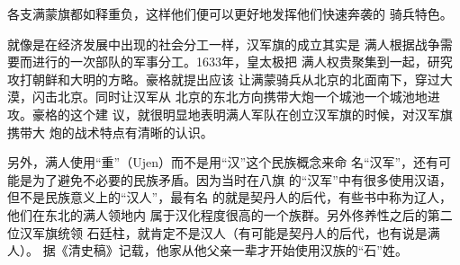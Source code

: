 各支满蒙旗都如释重负，这样他们便可以更好地发挥他们快速奔袭的%
骑兵特色。%
\par
就像是在经济发展中出现的社会分工一样，汉军旗的成立其实是%
满人根据战争需要而进行的一次部队的军事分工。1633年，皇太极把%
满人权贵聚集到一起，研究攻打朝鲜和大明的方略。豪格就提出应该%
让满蒙骑兵从北京的北面南下，穿过大漠，闪击北京。同时让汉军从%
北京的东北方向携带大炮一个城池一个城池地进攻。豪格的这个建%
议，就很明显地表明满人军队在创立汉军旗的时候，对汉军旗携带大%
炮的战术特点有清晰的认识。%
\par
另外，满人使用“重”（Ujen）而不是用“汉”这个民族概念来命%
名“汉军”，还有可能是为了避免不必要的民族矛盾。因为当时在八旗%
的“汉军”中有很多使用汉语，但不是民族意义上的“汉人”，最有名%
的就是契丹人的后代，有些书中称为辽人，他们在东北的满人领地内%
属于汉化程度很高的一个族群。另外佟养性之后的第二位汉军旗统领%
石廷柱，就肯定不是汉人（有可能是契丹人的后代，也有说是满人）。%
据《清史稿》记载，他家从他父亲一辈才开始使用汉族的“石”姓。%
